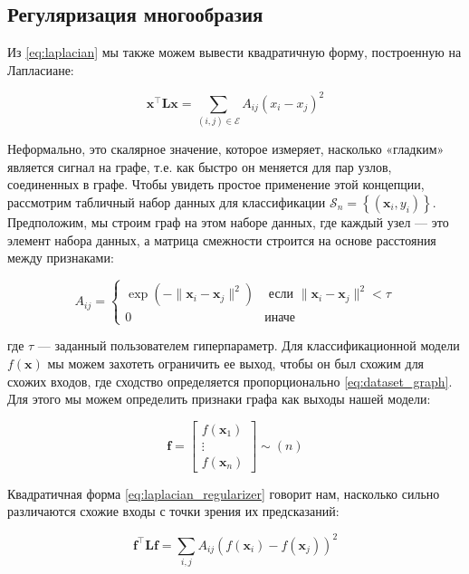 \subsection{Регуляризация многообразия}

Из \eqref{eq:laplacian} мы также можем вывести квадратичную форму, построенную на Лапласиане:

\begin{equation}
\mathbf{x}^\top\mathbf{L}\mathbf{x}=\sum_{(i,j)\in \mathcal{E}}A_{ij}(x_i-x_j)^2
\label{eq:laplacian_regularizer}
\end{equation}

Неформально, это скалярное значение, которое измеряет, насколько «гладким» является сигнал на графе, т.е. как быстро он меняется для пар узлов, соединенных в графе. Чтобы увидеть простое применение этой концепции, рассмотрим табличный набор данных для классификации $\mathcal{S}_n = \left\{(\mathbf{x}_i, y_i)\right\}$. Предположим, мы строим граф на этом наборе данных, где каждый узел — это элемент набора данных, а матрица смежности строится на основе расстояния между признаками:

\begin{equation}
A_{ij}=\begin{cases} \exp(-\lVert \mathbf{x}_i - \mathbf{x}_j \rVert^2) & \text{ если } \lVert \mathbf{x}_i - \mathbf{x}_j \rVert^2 < \tau \\ 0 & \text{иначе} \end{cases}
\label{eq:dataset_graph}
\end{equation}

где $\tau$ — заданный пользователем гиперпараметр. Для классификационной модели $f(\mathbf{x})$ мы можем захотеть ограничить ее выход, чтобы он был схожим для схожих входов, где сходство определяется пропорционально \eqref{eq:dataset_graph}. Для этого мы можем определить признаки графа как выходы нашей модели:

$$
\mathbf{f} = \begin{bmatrix} f(\mathbf{x}_1) \\ \vdots \\ f(\mathbf{x}_n) \end{bmatrix} \sim (n)
$$

Квадратичная форма \eqref{eq:laplacian_regularizer} говорит нам, насколько сильно различаются схожие входы с точки зрения их предсказаний:

\begin{equation}
\mathbf{f}^\top\mathbf{L}\mathbf{f} = \sum_{i,j} A_{ij}(f(\mathbf{x}_i)-f(\mathbf{x}_j))^2
\label{eq:manifold_regularizer}
\end{equation}

